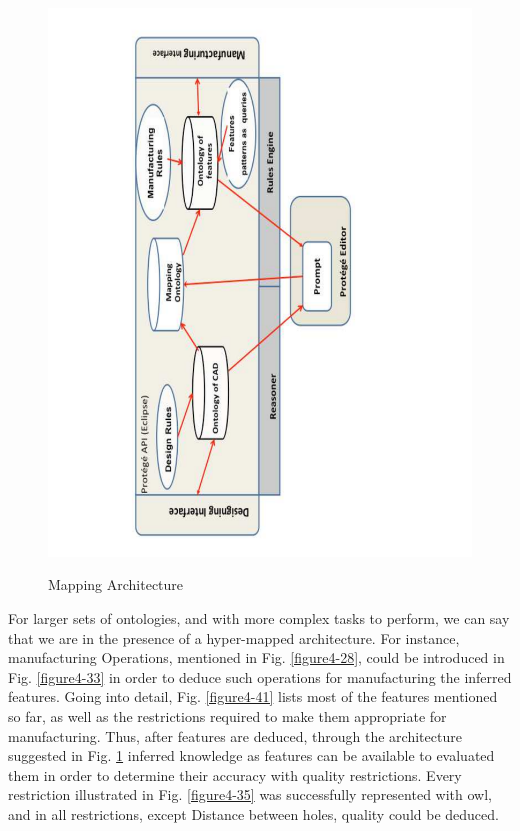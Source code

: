 \begin{figure}
\begin{center}
	\includegraphics[scale=0.5, angle=270]{figure-chapterIV/fig4-34}\\
	\caption{Mapping Architecture}
	\label{figure4-34}
\end{center}
\end{figure}


For larger sets of ontologies, and with more complex tasks to perform, we can say that we are in the presence of a hyper-mapped architecture. For instance, manufacturing Operations, mentioned in Fig. \ref{figure4-28}, could be introduced in Fig. \ref{figure4-33} in order to deduce such operations for manufacturing the inferred features. Going into detail, Fig. \ref{figure4-41} lists most of the features mentioned so far, as well as the restrictions required to make them appropriate for manufacturing. Thus, after features are deduced, through the architecture suggested in Fig. \ref{figure4-34} inferred knowledge as features can be available to evaluated  them in order to determine their accuracy with quality restrictions. Every restriction illustrated in Fig. \ref{figure4-35} was successfully represented with \gls{owl}, and in all restrictions,    except Distance between holes, quality could be deduced. 



